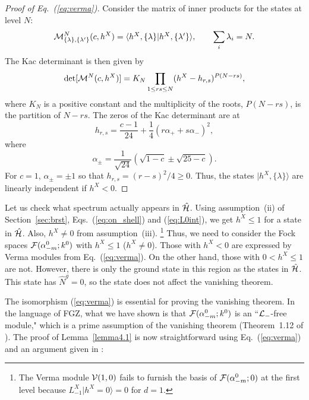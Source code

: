 \documentclass[a4paper,12pt]{article}
\newcommand{\ket}[1]{\mbox{$| #1 \rangle$}}
\newcommand{\norm}[2]{\mbox{$\langle #1 | #2 \rangle$}}
\newcommand{\eq}[1]{(\ref{eq:#1})}
\newcommand{\hN}{\hat{N}^g}
\begin{document}
\begin{proof}[Proof of Eq.~\eq{verma}]
Consider the matrix of inner products for the states at level $N$:
\begin{equation}
%
{\cal M}_{\{\lambda\}, \{\lambda'\}}^{N}(c, h^{X}) =
\norm{h^{X},\{\lambda\}}{h^{X},\{\lambda'\}},
\qquad \sum_i \lambda_i = N.
\label{eq:matrix}
%
\end{equation}
The Kac determinant is then given by
\begin{equation}
%
\mbox{det} [{\cal M}^{N}(c, h^{X})] = K_N \prod_{1 \leq rs \leq N}
(h^{X}-h_{r,s})^{P(N-rs)},
%
\end{equation}
where $K_N$ is a positive constant and the multiplicity of the roots,
$P(N-rs)$, is the partition of $N-rs$. The zeros of the Kac determinant are
at
\begin{equation}
%
h_{r,s} = \frac{c-1}{24} + \frac{1}{4} (r \alpha_+ + s \alpha_-)^2,
%
\end{equation}
where
\begin{equation}
%
\alpha_{\pm} = \frac{1}{\sqrt{24}} (\sqrt{1-c} \pm \sqrt{25-c}).
%
\end{equation}
For $c=1$, $\alpha_{\pm} = \pm 1$ so that $ h_{r,s} = (r-s)^2/4 \geq 0 $.
Thus, the states $\ket{{h^{X},\{\lambda\}}}$ are linearly independent if $h^{X}<0$.
\end{proof}

Let us check what spectrum actually appears in $\hat{\cal H}$. Using assumption~(ii) of Section~\ref{sec:brst}, Eqs.~\eq{on_shell} and \eq{L0int},  we get $h^{X} \leq 1$ for a state in $\hat{\cal H}$. Also, $h^{X} \neq 0$ from assumption~(iii).%
\footnote{%
The Verma module ${\cal V}(1, 0)$ fails to furnish the basis of ${\cal F}(\alpha^{0}_{-m};0)$ at the first level because $L^{X}_{-1} \ket{h^{X}=0} = 0$ for $d=1$.\label{ft:exceptional}}
Thus, we need to consider the Fock spaces ${\cal F}(\alpha^{0}_{-m};k^0)$ with $h^{X} \leq 1$ ($h^{X} \neq 0$). Those with $h^{X} <0$ are expressed by Verma modules from Eq.~\eq{verma}. On the other hand, those with $0 < h^{X} \leq 1$ are not. However, there is only the ground state in this region as the states in $\hat{\cal H}$. This state has $\hN=0$, so the state does not affect the vanishing theorem.

The isomorphism \eq{verma} is essential for proving the vanishing theorem.
In the language of FGZ, what we have shown is that ${\cal
F}(\alpha^{0}_{-m};k^0)$ is an ``${\cal L}_-$-free module," which is a prime
assumption of the vanishing theorem (Theorem~1.12 of \cite{FGZ}). The proof
of Lemma~\ref{lemma4.1} is now straightforward using 
Eq.~\eq{verma} and an argument given in \cite{FK}:
\end{document}
